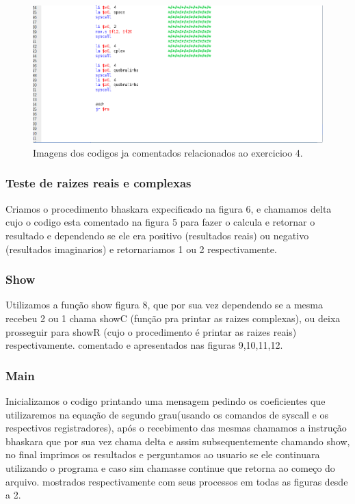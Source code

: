 \documentclass[12pt]{article}
\begin{document}
\begin{figure}[H]
	\centering
	\includegraphics[width=1\textwidth]{EX_4_12.png}
	\caption{Imagens dos codigos ja comentados relacionados ao exercicioo 4.}
	\label{fig:hilo}
\end{figure}

\subsubsection{Teste de raizes reais e complexas}
\label{subsubsec:testebhas}

Criamos o procedimento bhaskara expecificado na figura 6, e chamamos delta cujo o codigo esta comentado na figura 5 para fazer o calcula e retornar o resultado e dependendo se ele era positivo (resultados reais) ou negativo (resultados imaginarios) e retornariamos 1 ou 2 respectivamente.

\subsubsection{Show}
\label{subsubsec:show}

Utilizamos a função show figura 8, que por sua vez dependendo se a mesma recebeu 2 ou 1 chama showC (função pra printar as raizes complexas), ou deixa prosseguir para showR (cujo o procedimento é printar as raizes reais) respectivamente. comentado e apresentados nas figuras 9,10,11,12.

\subsubsection{Main}
\label{subsubsec:Main}

Inicializamos o codigo printando uma mensagem pedindo os coeficientes que utilizaremos na equação de segundo grau(usando os comandos de syscall e os respectivos registradores), após o recebimento das mesmas chamamos a instrução bhaskara que por sua vez chama delta e assim subsequentemente chamando show, no final imprimos os resultados e perguntamos ao usuario se ele continuara utilizando o programa e caso sim chamasse continue que retorna ao começo do arquivo. mostrados respectivamente com seus processos em todas as figuras desde a 2.
\end{document}
